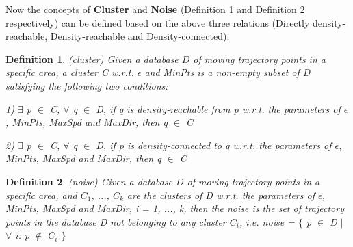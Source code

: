 \documentclass[12pt,glossary]{dalcsthesis}
\newtheorem{definition}{Definition}
\begin{document}
Now the concepts of \textbf{Cluster} and \textbf{Noise} (Definition \ref{def:cluster} and Definition \ref{def:noise} respectively) can be defined based on the above three relations (Directly density-reachable, Density-reachable and Density-connected):

\begin{definition}
\label{def:cluster}
(cluster)
Given a database $D$ of moving trajectory points in a specific area, a cluster C w.r.t. $\epsilon$ and MinPts is a non-empty subset of D satisfying the following two conditions:

1) $\exists$ p $\in$ C, $\forall$ q $\in$ D, if q is density-reachable from p w.r.t. the parameters of $\epsilon$, MinPts, MaxSpd and MaxDir, then q $\in$ C

2) $\exists$ p $\in$ C, $\forall$ q $\in$ D, if p is density-connected to q w.r.t. the parameters of $\epsilon$, MinPts, MaxSpd and MaxDir, then q $\in$ C

\end{definition}


\begin{definition}
\label{def:noise}
(noise)
Given a database $D$ of moving trajectory points in a specific area, and $C_1$, ..., $C_k$ are the clusters of D w.r.t. the parameters of $\epsilon$, MinPts, MaxSpd and MaxDir, i = 1, ..., k, then the noise is the set of trajectory points in the database D not belonging to any cluster $C_i$, i.e. noise = $\{$ p $\in$ D $\mid$ $\forall$ i: p $\notin$ $C_i$ $\}$
\end{definition}


\renewcommand{\algorithmicrequire}{\textbf{Input:}}
\renewcommand{\algorithmicensure}{\textbf{Output:}}
\end{document}
